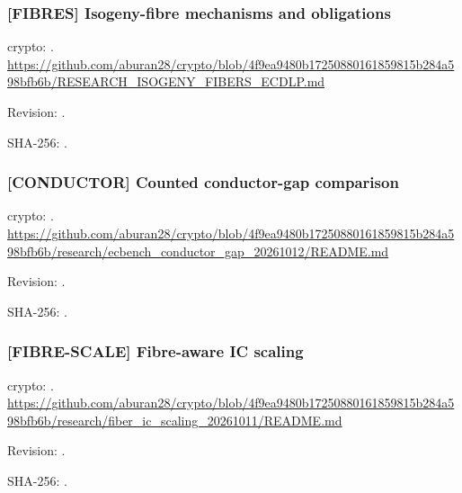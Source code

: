 \par\noindent\begin{minipage}{\linewidth}\small
\subsubsection*{[FIBRES] Isogeny-fibre mechanisms and obligations}\label{art:FIBRES}
crypto: .
\url{https://github.com/aburan28/crypto/blob/4f9ea9480b17250880161859815b284a598bfb6b/RESEARCH_ISOGENY_FIBERS_ECDLP.md}
\par Revision: .
\par SHA-256: .
\end{minipage}\par\medskip

\par\noindent\begin{minipage}{\linewidth}\small
\subsubsection*{[CONDUCTOR] Counted conductor-gap comparison}\label{art:CONDUCTOR}
crypto: .
\url{https://github.com/aburan28/crypto/blob/4f9ea9480b17250880161859815b284a598bfb6b/research/ecbench_conductor_gap_20261012/README.md}
\par Revision: .
\par SHA-256: .
\end{minipage}\par\medskip

\par\noindent\begin{minipage}{\linewidth}\small
\subsubsection*{[FIBRE-SCALE] Fibre-aware IC scaling}\label{art:FIBRE-SCALE}
crypto: .
\url{https://github.com/aburan28/crypto/blob/4f9ea9480b17250880161859815b284a598bfb6b/research/fiber_ic_scaling_20261011/README.md}
\par Revision: .
\par SHA-256: .
\end{minipage}\par\medskip

